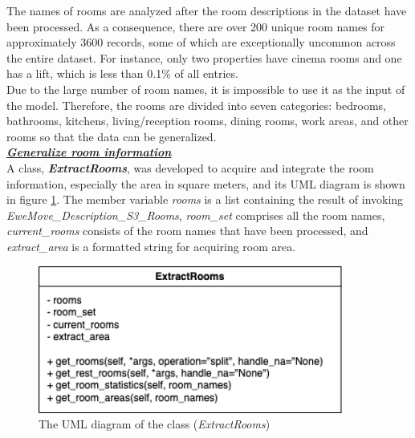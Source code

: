 \documentclass[12pt,twoside]{report}
\begin{document}
The names of rooms are analyzed after the room descriptions in the dataset have been processed. As a consequence, there are over 200 unique room names for approximately 3600 records, some of which are exceptionally uncommon across the entire dataset. For instance, only two properties have cinema rooms and one has a lift, which is less than 0.1\% of all entries.  
\\

Due to the large number of room names, it is impossible to use it as the input of the model. Therefore, the rooms are divided into seven categories: bedrooms, bathrooms, kitchens, living/reception rooms, dining rooms, work areas, and other rooms so that the data can be generalized. 
\\

\textbf{\textit{\underline{Generalize room information}}} \\
A class, \textit{\textbf{ExtractRooms}}, was developed to acquire and integrate the room information, especially the area in square meters, and its UML diagram is shown in figure \ref{uml_extract_rooms}. The member variable \textit{rooms} is a list containing the result of invoking \textit{EweMove\_Description\_S3\_Rooms}, \textit{room\_set} comprises all the room names, \textit{current\_rooms} consists of the room names that have been processed, and \textit{extract\_area} is a formatted string for acquiring room area. 
\\

\begin{figure}[h]
	\centering
	\includegraphics[width=10cm]{uml_extract_rooms}
	\caption{The UML diagram of the class (\textit{ExtractRooms})}
	\label{uml_extract_rooms}
\end{figure}
\end{document}
